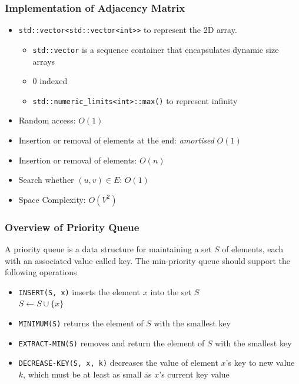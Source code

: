 \documentclass{beamer}
\begin{document}
\begin{frame}
	\frametitle{Implementation of Adjacency Matrix}
	\begin{itemize}
		\item \texttt{std::vector<std::vector<int>>} to represent the 2D array. 
		\begin{itemize}
			\item \texttt{std::vector} is a sequence container that encapsulates dynamic size arrays
			\item 0 indexed
			\item \texttt{std::numeric\_limits<int>::max()} to represent infinity
		\end{itemize}
		\item Random access: \( O(1) \) 
		\item Insertion or removal of elements at the end: \emph{amortised} \( O(1) \) 
		\item Insertion or removal of elements: \( O(n) \) 
		\item Search whether \( (u,v) \in E \): \( O(1) \) 
		\item Space Complexity: \( O(V^2) \) 
	\end{itemize}
\end{frame}

\begin{frame}
	\frametitle{Overview of Priority Queue}
	A priority queue is a data structure for maintaining a set \( S \) of elements, each with an associated value called key. The min-priority queue should support the following operations
	\begin{itemize}
		\item \texttt{INSERT(S, x)} inserts the element \( x \) into the set \( S \)\\
			\( S \leftarrow S \cup \{x\} \) 
		\item \texttt{MINIMUM(S)} returns the element of $S$ with the smallest key
		\item \texttt{EXTRACT-MIN(S)} removes and return the element of \( S \) with the smallest key
		\item \texttt{DECREASE-KEY(S, x, k)} decreases the value of element \( x \)'s key to new value \( k \), which must be at least as small as \( x \)'s current key value
	\end{itemize}
\end{frame}
\end{document}
